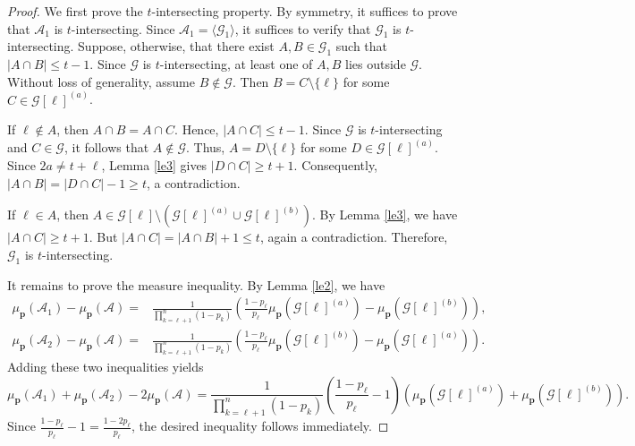 \documentclass[11pt]{article}
\begin{document}
\begin{proof}
We first prove the $t$-intersecting property. By symmetry, it suffices to prove that $\mathcal{A}_1$ is $t$-intersecting. Since $\mathcal{A}_1=\langle\mathcal{G}_1\rangle$, it suffices to verify that $\mathcal{G}_1$ is $t$-intersecting.  Suppose, otherwise, that there exist $A,B\in\mathcal{G}_1$ such that $|A\cap B|\le t-1$. Since $\mathcal{G}$ is $t$-intersecting, at least one of  $A, B$ lies outside $\mathcal{G}$. Without loss of generality, assume $B\notin\mathcal{G}$. Then $B=C\setminus\{\ell\}$ for some $C\in\mathcal{G}[\ell]^{(a)}$.

If $\ell\notin A$, then $A\cap B=A\cap C$. Hence, $|A\cap C|\le t-1$.  Since  $\mathcal{G}$ is $t$-intersecting and $C\in\mathcal{G}$, it follows that $A\notin \mathcal{G}$. Thus, $A=D\setminus\{\ell\}$ for some $D\in\mathcal{G}[\ell]^{(a)}$. Since $2a\neq t+\ell$, Lemma \ref{le3} gives $|D\cap C|\geq t+1$. Consequently, $|A\cap B|=|D\cap C|-1\geq t$, a contradiction.


If $\ell\in A$, then $A\in\mathcal{G}[\ell]\setminus\left(\mathcal{G}[\ell]^{(a)}\cup\mathcal{G}[\ell]^{(b)}\right)$.  By Lemma \ref{le3}, we have $|A\cap C|\ge t+1$. But $|A\cap C|=|A\cap B|+1\le t$, again a contradiction.
Therefore, $\mathcal{G}_1$ is $t$-intersecting. 

It remains to prove the  measure inequality. By Lemma \ref{le2}, we have
\begin{align*}
\mu_{\mathbf{p}}(\mathcal{A}_1)-\mu_{\mathbf{p}}(\mathcal{A})
=&
\frac{1}{\prod_{k=\ell+1}^n(1-p_k)}
\left(
\frac{1-p_{\ell}}{p_{\ell}}\mu_{\mathbf{p}}\left(\mathcal{G}[\ell]^{(a)}\right)
-\mu_{\mathbf{p}}\left(\mathcal{G}[\ell]^{(b)}\right)
\right),\\
\mu_{\mathbf{p}}(\mathcal{A}_2)-\mu_{\mathbf{p}}(\mathcal{A})
=&
\frac{1}{\prod_{k=\ell+1}^n(1-p_k)}
\left(
\frac{1-p_{\ell}}{p_{\ell}}\mu_{\mathbf{p}}\left(\mathcal{G}[\ell]^{(b)}\right)
-\mu_{\mathbf{p}}\left(\mathcal{G}[\ell]^{(a)}\right)
\right).
\end{align*}
Adding these two inequalities yields
$$
\mu_{\mathbf{p}}(\mathcal{A}_1)+\mu_{\mathbf{p}}(\mathcal{A}_2)-2\mu_{\mathbf{p}}(\mathcal{A})
=
\frac{1}{\prod_{k=\ell+1}^n(1-p_k)}
\left(
\frac{1-p_{\ell}}{p_{\ell}}-1
\right)
\left(\mu_{\mathbf{p}}\left(\mathcal{G}[\ell]^{(a)}\right)+\mu_{\mathbf{p}}\left(\mathcal{G}[\ell]^{(b)}\right)
\right).
$$
Since $\frac{1-p_{\ell}}{p_{\ell}}-1=\frac{1-2p_{\ell}}{p_{\ell}}$,
the desired inequality follows immediately.
\end{proof}
\end{document}
